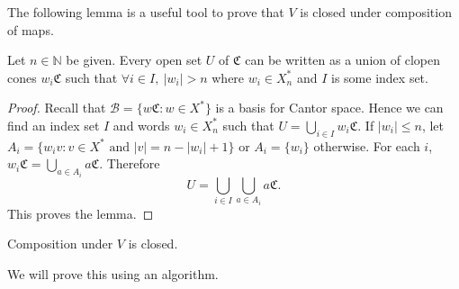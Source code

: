 \documentclass[12pt]{amsart}
\newcommand{\xns}{X_n^*}
\begin{document}
        The following lemma is a useful tool to prove that $V$ is closed under composition of maps.
        
        \begin{lemma}\label{union-open-cones}
            Let $n \in \mathbb{N}$ be given. Every open set $U$ of $\mathfrak{C}$ can be written as a union of clopen cones $w_i \mathfrak{C}$ such that $\forall i \in I , \  |w_i| > n$ where $w_i \in \xns$ and $I$ is some index set.
        \end{lemma}
        
        \begin{proof}
            Recall that $\mathscr{B} = \{w \mathfrak{C} : w \in X^*\}$ is a basis for Cantor space. Hence we can find an index set $I$ and words $w_i \in \xns$ such that $U = \bigcup_{i \in I} w_i \mathfrak{C}$. %
            If $|w_i| \leq n$, let $A_i = \{w_i v : v \in X^* \text{ and } |v|= n-|w_i|+1\}$ or $A_i= \{w_i\}$ otherwise. For each $i$, $w_i \mathfrak{C} = \bigcup_{a \in A_i}a \mathfrak{C}$. Therefore $$U = \bigcup_{i \in I} \bigcup_{a \in A_i} a \mathfrak{C}.$$ This proves the lemma.
        \end{proof}
        
        \begin{lemma}\label{comp-v-closed}
            Composition under $V$ is closed.
        \end{lemma}
        
        We will prove this using an algorithm. 
        
\end{document}
